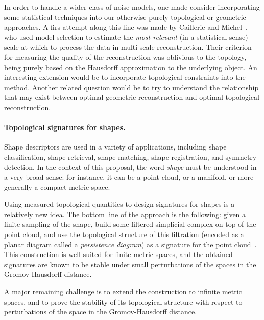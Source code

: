 In order to handle a wider class of noise models, one made consider
incorporating some statistical techniques into our otherwise purely
topological or geometric approaches. A firs attempt along this line
was made by Caillerie and Michel~\cite{claire-bertrand}, who used
model selection to estimate the {\em most relevant} (in a statistical
sense) scale at which to process the data in multi-scale
reconstruction. Their criterion for measuring the quality of the
reconstruction was oblivious to the topology, being purely based on
the Hausdorff approximation to the underlying object. An interesting
extension would be to incorporate topological constraints into the
method. Another related question would be to try to understand the
relationship that may exist between optimal geometric reconstruction
and optimal topological reconstruction.


\paragraph{Topological signatures for shapes.}

Shape descriptors are used in a variety of applications, including
shape classification, shape retrieval, shape matching, shape
registration, and symmetry detection. In the context of this proposal,
the word {\em shape} must be understood in a very broad sense: for
instance, it can be a point cloud, or a
manifold, or more generally a compact metric space.

Using measured topological quantities to design signatures for shapes
is a relatively new idea. The bottom line of the approach is the
following: given a finite sampling of the shape, build some filtered
simplicial complex on top of the point cloud, and use the topological
structure of this filtration (encoded as a planar diagram called a
{\em persistence diagram}) as a signature for the point
cloud~\cite{ccgmo-ghsssp-09, socg-pbsds-10}. This construction is
well-suited for finite metric spaces, and the obtained signatures are
known to be stable under small perturbations of the spaces in the
Gromov-Hausdorff distance.  

A major remaining challenge is to extend the
construction to infinite metric spaces, and to prove the stability of
its topological structure with respect to perturbations of the space
in the Gromov-Hausdorff distance.

